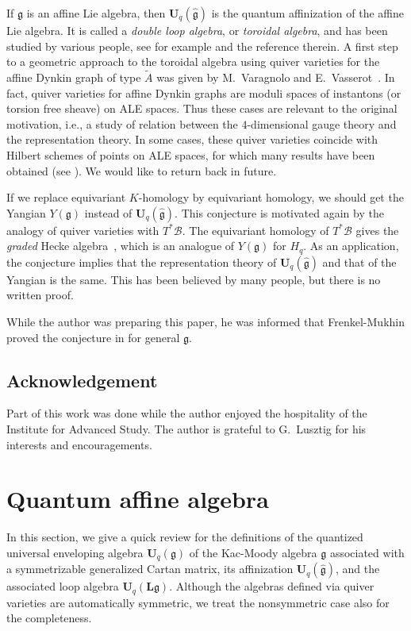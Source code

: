 \documentclass[12pt]{amsart}
\theoremstyle{definition}
\theoremstyle{remark}
\numberwithin{equation}{subsection}
\newcommand{\Uq}{{\mathbf U}_q(\mathfrak g)} %
\newcommand{\Ua}{{\mathbf U}_q(\widehat{\mathfrak g})} %
\newcommand{\Ul}{{\mathbf U}_q({\mathbf L}{\mathfrak g})} %
\begin{document}
If $\mathfrak g$ is an affine Lie algebra, then $\Ua$ is the quantum
affinization of the affine Lie algebra. It is called a {\it double
loop algebra}, or {\it toroidal algebra}, and has been studied by
various people, see for example \cite{GKV,Saito,STU,VV1} and the
reference therein. A first step to a geometric approach to the
toroidal algebra using quiver varieties for the affine Dynkin graph of
type $\widetilde A$ was given by M.~Varagnolo and
E.~Vasserot~\cite{VV2}.
%
In fact, quiver varieties for affine Dynkin graphs are moduli spaces
of instantons (or torsion free sheave) on ALE spaces. Thus these cases
are relevant to the original motivation, i.e., a study of relation
between the $4$-dimensional gauge theory and the representation
theory. In some cases, these quiver varieties coincide with Hilbert
schemes of points on ALE spaces, for which many results have been
obtained (see \cite{Lecture}). We would like to return back in future.

If we replace equivariant $K$-homology by equivariant homology, we
should get the Yangian $Y(\mathfrak g)$ instead of $\Ua$. This
conjecture is motivated again by the analogy of quiver varieties with
$T^*\mathcal B$. The equivariant homology of $T^*\mathcal B$ gives the
{\it graded\/} Hecke algebra~\cite{Lu:GH}, which is an analogue of
$Y(\mathfrak g)$ for $H_q$.
%
As an application, the conjecture implies that the representation
theory of $\Ua$ and that of the Yangian is the same. This has been
believed by many people, but there is no written proof.

While the author was preparing this paper, he was informed that
Frenkel-Mukhin \cite{FM} proved the conjecture in \cite{FR} for
general $\mathfrak g$.

\subsection*{Acknowledgement}
Part of this work was done while the author enjoyed the hospitality of
the Institute for Advanced Study. The author is grateful to G.~Lusztig 
for his interests and encouragements.

\tableofcontents

\section{Quantum affine algebra}\label{sec:alg}
%
In this section, we give a quick review for the definitions of the
quantized universal enveloping algebra $\Uq$ of the Kac-Moody algebra
$\mathfrak g$ associated with a symmetrizable generalized Cartan
matrix, its affinization $\Ua$, and the associated loop algebra $\Ul$.
%
Although the algebras defined via quiver varieties are automatically
symmetric, we treat the nonsymmetric case also for the
completeness.
\end{document}
